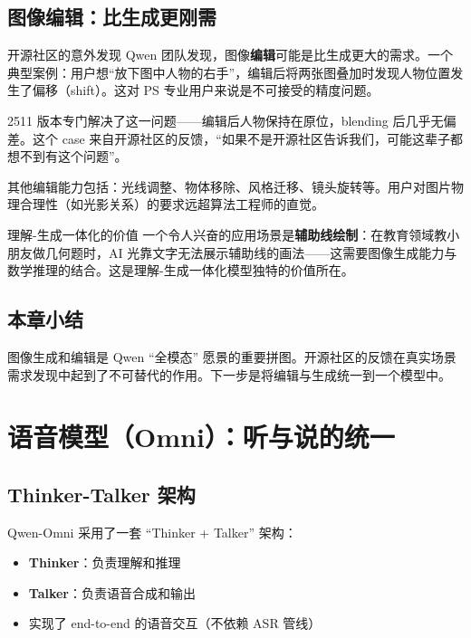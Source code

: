 \documentclass[a4paper]{article}
\begin{document}
\subsection{图像编辑：比生成更刚需}

\begin{importantbox}{开源社区的意外发现}
Qwen 团队发现，图像\textbf{编辑}可能是比生成更大的需求。一个典型案例：用户想``放下图中人物的右手''，编辑后将两张图叠加时发现人物位置发生了偏移（shift）。这对 PS 专业用户来说是不可接受的精度问题。

2511 版本专门解决了这一问题——编辑后人物保持在原位，blending 后几乎无偏差。这个 case 来自开源社区的反馈，``如果不是开源社区告诉我们，可能这辈子都想不到有这个问题''。
\end{importantbox}

其他编辑能力包括：光线调整、物体移除、风格迁移、镜头旋转等。用户对图片物理合理性（如光影关系）的要求远超算法工程师的直觉。

\begin{knowledgebox}{理解-生成一体化的价值}
一个令人兴奋的应用场景是\textbf{辅助线绘制}：在教育领域教小朋友做几何题时，AI 光靠文字无法展示辅助线的画法——这需要图像生成能力与数学推理的结合。这是理解-生成一体化模型独特的价值所在。
\end{knowledgebox}

\subsection{本章小结}

图像生成和编辑是 Qwen ``全模态'' 愿景的重要拼图。开源社区的反馈在真实场景需求发现中起到了不可替代的作用。下一步是将编辑与生成统一到一个模型中。

\section{语音模型（Omni）：听与说的统一}

\subsection{Thinker-Talker 架构}

Qwen-Omni 采用了一套 ``Thinker + Talker'' 架构：

\begin{itemize}
    \item \textbf{Thinker}：负责理解和推理
    \item \textbf{Talker}：负责语音合成和输出
    \item 实现了 end-to-end 的语音交互（不依赖 ASR 管线）
\end{itemize}
\end{document}
